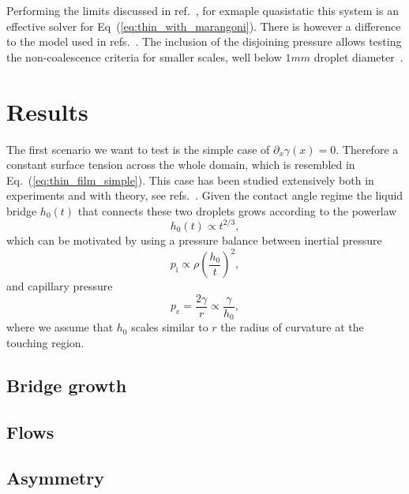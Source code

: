 \documentclass[twocolumn,amsmath,amssymb,showpacs,pre,nofootinbib,superscriptaddress]{revtex4-1} %
\begin{document}
Performing the limits discussed in ref.~\cite{PhysRevE.100.033313, PhysRevE.104.034801}, for exmaple quasistatic this system is an effective solver for Eq~(\ref{eq:thin_with_marangoni}).
There is however a difference to the model used in refs.~\cite{doi:10.1021/la500459v, karpitschka2014sharp}.
The inclusion of the disjoining pressure allows testing the non-coalescence criteria for smaller scales, well below $1mm$ droplet diameter~\cite{karpitschka2014sharp}.

\section{Results}\label{sec:results}
The first scenario we want to test is the simple case of $\partial_x\gamma(x) = 0$.
Therefore a constant surface tension across the whole domain, which is resembled in Eq.~(\ref{eq:thin_film_simple}).
This case has been studied extensively both in experiments and with theory, see refs.~\cite{eggers_lister_stone_1999, PhysRevLett.95.164503, PhysRevLett.111.144502, duchemin_eggers_josserand_2003}. 
Given the contact angle regime the liquid bridge $h_0(t)$ that connects these two droplets grows according to the powerlaw 
\begin{equation}\label{eq:bridge_power23}
    h_0(t) \propto t^{2/3},
\end{equation}
which can be motivated by using a pressure balance between inertial pressure
\begin{equation}\label{eq:p_inert}
    p_{\text{i}} \propto \rho\left(\frac{h_0}{t}\right)^2,
\end{equation}
and capillary pressure~\cite{doi:10.1021/la800630w}
\begin{equation}\label{eq:p_cap}
    p_{\text{c}} = \frac{2\gamma}{r} \propto \frac{\gamma}{h_0},
\end{equation}
where we assume that $h_0$ scales similar to $r$ the radius of curvature at the touching region.

\subsection{Bridge growth}\label{subsec:growth}



\subsection{Flows}\label{subsec:flows}

\subsection{Asymmetry}\label{subsec:skewness}
\end{document}
